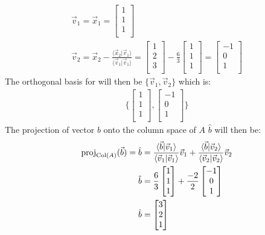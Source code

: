 \documentclass[11pt, a4paper]{article}
\begin{document}
\begin{gather}
  \vec{v}_1 = \vec{x}_1 = \begin{bmatrix} 1\\ 1\\ 1\\ \end{bmatrix}\\
  \vec{v}_2 = \vec{x}_2 - \frac{\langle \vec{x}_2 | \vec{v}_1 \rangle}{\langle \vec{v}_1 | \vec{v}_1 \rangle} = \begin{bmatrix} 1\\ 2\\ 3\\ \end{bmatrix} - \frac{6}{3} \begin{bmatrix} 1\\ 1\\ 1\\ \end{bmatrix} = \begin{bmatrix} -1\\ 0\\ 1\\ \end{bmatrix}
\end{gather}
The orthogonal basis for will then be $\{\vec{v}_1, \vec{v}_2 \}$ which is:
\begin{gather}
  \Bigg\{ 
    \begin{bmatrix} 1\\ 1\\ 1\\ \end{bmatrix},
    \begin{bmatrix} -1\\ 0\\ 1\\ \end{bmatrix} 
  \Bigg\}
\end{gather}
The projection of vector $b$ onto the column space of $A$ $\hat{b}$ will then be:
\begin{align}
  \text{proj}_{\text{Col}(A)}(\vec{b}) = \hat{b} &= \frac{\langle \vec{b} | \vec{v}_1 \rangle}{\langle \vec{v}_1 | \vec{v}_1 \rangle}\vec{v}_1 + \frac{\langle \vec{b} | \vec{v}_2 \rangle}{\langle \vec{v}_2 | \vec{v}_2 \rangle}\vec{v}_2 \notag\\
  \hat{b} &= \frac{6}{3}\begin{bmatrix} 1\\ 1\\ 1\\ \end{bmatrix} + \frac{-2}{2}\begin{bmatrix} -1\\ 0\\ 1\\ \end{bmatrix} \notag\\ 
  \hat{b} &= \begin{bmatrix} 3\\ 2\\ 1\\ \end{bmatrix}
\end{align}
\end{document}
